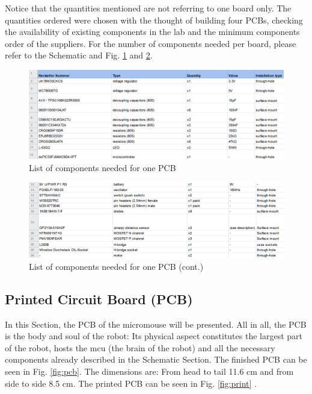 \FloatBarrier
\noindent
Notice that the quantities mentioned are not referring to one board only. The quantities ordered were chosen with the thought of building four PCBs, checking the availability of existing components in the lab and the minimum components order of the suppliers. 
For the number of components needed per board, please refer to the Schematic and Fig. \ref{fig:comp1} and \ref{fig:comp2}.

\begin{figure}[htb]
    \centering
    \includegraphics[width=1\textwidth]{figures/hardware/CompList.PNG}
    \caption{List of components needed for one PCB}
    \label{fig:comp1}
\end{figure}


\begin{figure}[htb]
    \centering
    \includegraphics[width=1\textwidth]{figures/hardware/CompList2.PNG}
    \caption{List of components needed for one PCB (cont.)}
    \label{fig:comp2}
\end{figure}
\FloatBarrier

\vspace{1cm}


\subsection{Printed Circuit Board (PCB)}

In this Section, the PCB of the micromouse will be presented. All in all, the PCB is the body and soul of the robot: Its physical aspect constitutes the largest part of the robot, hosts the mcu (the brain of the robot) and all the necessary components already described in the Schematic Section. 
The finished PCB can be seen in Fig. \ref{fig:pcb}. The dimensions are: From head to tail 11.6 cm and from side to side 8.5 cm. The printed PCB can be seen in Fig. \ref{fig:print} .

